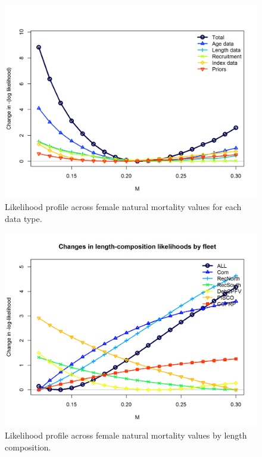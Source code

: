 \documentclass[12pt,]{article}
\begin{document}
\FloatBarrier 

\begin{figure}
\centering
\includegraphics{Figures/profile_m_like.png}
\caption{Likelihood profile across female natural mortality values for
each data type. \label{fig:profile_m_like}}
\end{figure}

\FloatBarrier

\begin{figure}
\centering
\includegraphics{Figures/profile_m_piner.png}
\caption{Likelihood profile across female natural mortality values by
length composition. \label{fig:profile_m_piner}}
\end{figure}
\end{document}
